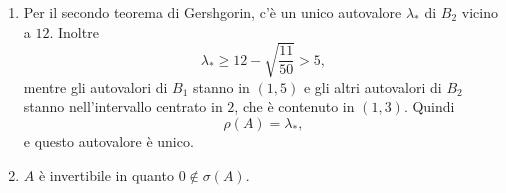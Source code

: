 \documentclass[a4paper]{article}
\begin{document}
\begin{snippetsolution}{}
\begin{enumerate}
            Diamo un bound:
            \[
                \frac1{10} \left(1 + \frac{1}{9+j}\right)
                \leq
                \alpha_j \delta_j
                \leq
                \frac15 \left(1 + \frac{1}{9+j}\right)
                \leq
                \frac{11}{50}.
            \]
            Vogliamo anche stimare la somma:
            \[
                \sqrt{\alpha_{i-1}\delta_{i-1}} + \sqrt{\alpha_i \delta_i}
                \leq
                \sqrt{
                    \frac{i + 9}{i + 8}\frac15
                }
                +
                \sqrt{
                    \frac{i + 10}{i + 9}\frac15
                }
                \leq
                \sqrt{\frac{11}{50}} + \sqrt{\frac{12}{55}},
            \]
            dove il massimo si ottiene per \(i=2\). Quindi
            \[
                \sigma(B_2) = \sigma(\tilde B) \subseteq
                \left[
                    2 - \left(\sqrt{\frac{11}{50}} + \sqrt{\frac{12}{55}}\right),
                    2 + \sqrt{\frac{11}{50}} + \sqrt{\frac{12}{55}}
                \right]
                \union
                \left[
                    12 - \sqrt{\frac{11}{50}},
                    12 + \sqrt{\frac{11}{50}}
                \right].
            \]
            Il primo intervallo è contenuto in \((1,3)\), mentre il secondo è isolato
            rispetto al primo. Per il secondo teorema di Gershgorin, il primo intervallo
            contiene \(m_2-1\) autovalori di \(B_2\), mentre il secondo intervallo
            contiene un unico autovalore. Inoltre, per il terzo teorema di Gershgorin,
            siccome \(\tilde B\) è irriducibile, questo autovalore non può stare sul bordo
            del disco isolato.

        \item Per il secondo teorema di Gershgorin, c'è un unico autovalore
            \(\lambda_\ast\) di \(B_2\) vicino a \(12\). Inoltre
            \[
                \lambda_\ast \geq 12 - \sqrt{\frac{11}{50}} > 5,
            \]
            mentre gli autovalori di \(B_1\) stanno in \((1,5)\) e gli altri autovalori
            di \(B_2\) stanno nell'intervallo centrato in \(2\), che è contenuto in \((1,3)\).
            Quindi
            \[
                \rho(A)=\lambda_\ast,
            \]
            e questo autovalore è unico.

        \item \(A\) è invertibile in quanto \(0 \notin \sigma(A)\).


\end{enumerate}
\end{snippetsolution}
\end{document}

